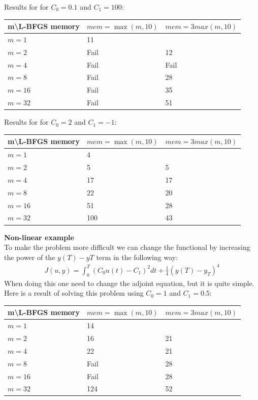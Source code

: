\documentclass[11pt,a4paper]{report}
\begin{document}
Results for for $C_0=0.1 $ and $C_1= 100$:
\begin{center}
    \begin{tabular}{| l | l | l |}
    \hline
    m\textbackslash L-BFGS memory & $mem =\max(m,10)$& $mem=3max(m,10)$\\ \hline
    $m=1$  &  11 &  \\ \hline
    $m=2$  &  Fail &  12	\\ \hline
    $m=4$ &  Fail & Fail \\ \hline
    $m=8$ &  Fail &  28	\\ \hline
    $m=16$ &  Fail & 35 \\ \hline
    $m=32$ &  Fail &  51	\\ \hline
    \end{tabular}
\end{center}
Results for for $C_0=2 $ and $C_1= -1$:
\begin{center}
    \begin{tabular}{| l | l | l |}
    \hline
    m\textbackslash L-BFGS memory & $mem =\max(m,10)$& $mem=3max(m,10)$\\ \hline
    $m=1$  &  4 &  \\ \hline
    $m=2$  &  5 &  5	\\ \hline
    $m=4$ &  17 & 17 \\ \hline
    $m=8$ &  22 &  20	\\ \hline
    $m=16$ &  51 & 28 \\ \hline
    $m=32$ &  100 &  43	\\ \hline
    \end{tabular}
\end{center}
\textbf{Non-linear example}
\\
To make the problem more difficult we can change the functional by increasing the power of the $y(T)-yT$ term in the following way:
\begin{align*}
J(u,y) = \int_0^T (C_0u(t)-C_1)^2dt + \frac{1}{4}(y(T)-y_T)^4
\end{align*}
When doing this one need to change the adjoint equation, but it is quite simple. Here is a result of solving this problem using $C_0=1 $ and $C_1= 0.5$:
\begin{center}
    \begin{tabular}{| l | l | l |}
    \hline
    m\textbackslash L-BFGS memory & $mem =\max(m,10)$& $mem=3max(m,10)$\\ \hline
    $m=1$  &  14 &  \\ \hline
    $m=2$  &  16 & 21 	\\ \hline
    $m=4$ &  22 & 21 \\ \hline
    $m=8$ &  Fail &  28	\\ \hline
    $m=16$ &  Fail & 28 \\ \hline
    $m=32$ &  124 &  52	\\ \hline
    \end{tabular}
\end{center}
\end{document}
